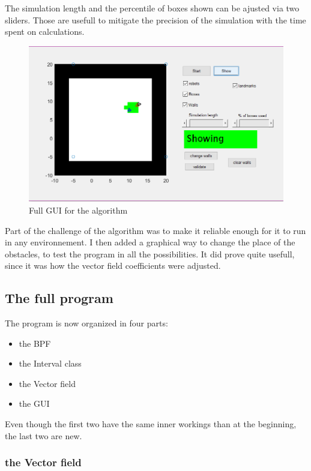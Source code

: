 The simulation length and the percentile of boxes shown can be ajusted via two sliders. Those are usefull to mitigate the precision of the simulation with the time spent on calculations.\\

\begin{figure}[ht]
\centering
\includegraphics[scale=0.7]{Figures/Gui}
\decoRule
\caption[Gui]{Full GUI for the algorithm}
\label{fig:gui}
\end{figure}

Part of the challenge of the algorithm was to make it reliable enough for it to run in any environnement.
I then added a graphical way to change the place of the obstacles, to test the program in all the possibilities.
It did prove quite usefull, since it was how the vector field coefficients were adjusted.


\subsection{The full program}

The program is now organized in four parts:
\begin{itemize}
  \item the BPF
  \item the Interval class
  \item the Vector field
  \item the GUI
\end{itemize}
Even though the first two have the same inner workings than at the beginning, the last two are new.

\subsubsection{the Vector field}

